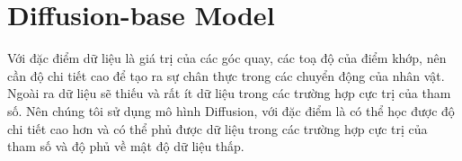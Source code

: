 
\section{Diffusion-base Model}



Với đặc điểm dữ liệu là giá trị của các góc quay, các toạ độ của điểm khớp, nên cần độ chi tiết cao để tạo ra sự chân thực trong các chuyển động của nhân vật. Ngoài ra dữ liệu sẽ thiếu và rất ít dữ liệu trong các trường hợp cực trị của tham số.
Nên chúng tôi sử dụng mô hình Diffusion, với đặc điểm là có thể học được độ chi tiết cao hơn và có thể phủ được dữ liệu trong các trường hợp cực trị của tham số và độ phủ về mật độ dữ liệu thấp.

